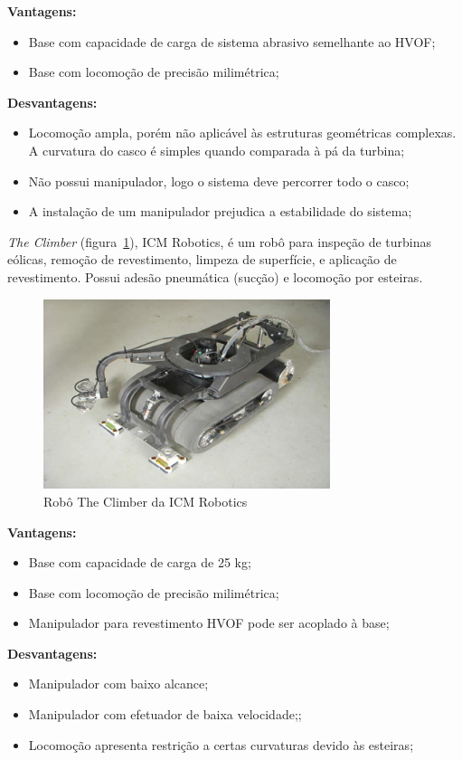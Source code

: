 \textbf{Vantagens:}
\begin{itemize}
  \item Base com capacidade de carga de sistema abrasivo semelhante ao HVOF;
  \item Base com locomoção de precisão milimétrica;
\end{itemize}

\textbf{Desvantagens:}
\begin{itemize}
  \item Locomoção ampla, porém não aplicável às estruturas geométricas
  complexas. A curvatura do casco é simples quando comparada à pá da turbina;
  \item Não possui manipulador, logo o sistema deve percorrer todo o
  casco;
  \item A instalação de um manipulador prejudica a estabilidade do sistema;
\end{itemize}

\emph{The Climber} (figura~\ref{icm}), ICM Robotics, é um robô para inspeção de
turbinas eólicas, remoção de revestimento, limpeza de superfície, e aplicação de revestimento.
Possui adesão pneumática (sucção) e locomoção por esteiras. 

\begin{figure}[ht]
\centering
\includegraphics[width=8.4cm]{figs/climbers/icm.png}
\caption{Robô The Climber da ICM Robotics}
\label{icm}
\end{figure}

\textbf{Vantagens:}
\begin{itemize}
  \item Base com capacidade de carga de 25 kg;
  \item Base com locomoção de precisão milimétrica;
  \item Manipulador para revestimento HVOF pode ser acoplado à base; 
\end{itemize}

\textbf{Desvantagens:}
\begin{itemize}
  \item Manipulador com baixo alcance;
  \item Manipulador com efetuador de baixa velocidade;;
  \item Locomoção apresenta restrição a certas curvaturas devido às esteiras;
\end{itemize}

